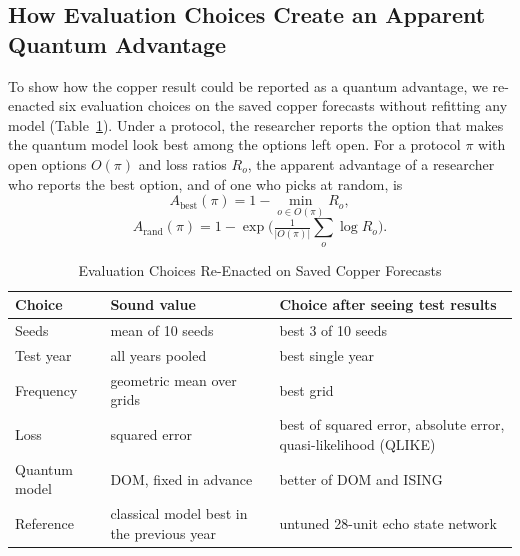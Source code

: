 \documentclass{ieeeaccess}
\begin{document}
\subsection{How Evaluation Choices Create an Apparent Quantum Advantage}
\label{sec:res-choices}
To show how the copper result could be reported as a quantum advantage, we re-enacted six evaluation choices on the saved copper forecasts without refitting any model (Table~\ref{tab:factors}). Under a protocol, the researcher reports the option that makes the quantum model look best among the options left open. For a protocol $\pi$ with open options $O(\pi)$ and loss ratios $R_o$, the apparent advantage of a researcher who reports the best option, and of one who picks at random, is
\begin{equation}
A_{\mathrm{best}}(\pi)=1-\min_{o\in O(\pi)}R_o,
\label{eq:adv}
\end{equation}
\begin{equation}
A_{\mathrm{rand}}(\pi)=1-\exp\Big(\tfrac{1}{|O(\pi)|}\textstyle\sum_{o}\log R_o\Big).
\label{eq:advrand}
\end{equation}

\begin{table}[t]
\caption{Evaluation Choices Re-Enacted on Saved Copper Forecasts}
\label{tab:factors}
\centering
\begin{tabular}{p{1.45cm}p{2.95cm}p{2.95cm}}
\hline
Choice & Sound value & Choice after seeing test results \\
\hline
Seeds & mean of 10 seeds & best 3 of 10 seeds \\
Test year & all years pooled & best single year \\
Frequency & geometric mean over grids & best grid \\
Loss & squared error & best of squared error, absolute error, quasi-likelihood (QLIKE) \\
Quantum model & DOM, fixed in advance & better of DOM and ISING \\
Reference & classical model best in the previous year & untuned 28-unit echo state network \\
\hline
\end{tabular}
\end{table}
\end{document}
